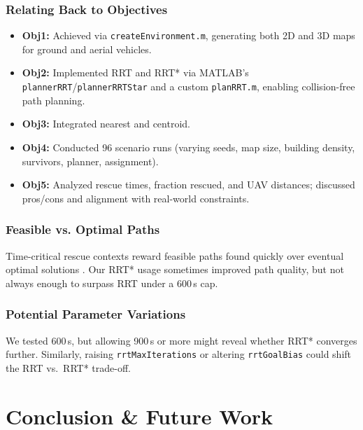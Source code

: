 \documentclass[12pt,a4paper]{report}
\begin{document}
\subsection{Relating Back to Objectives}
\begin{itemize}
    \item \textbf{Obj1:} Achieved via \texttt{createEnvironment.m}, generating both 2D 
    and 3D maps for ground and aerial vehicles.
    \item \textbf{Obj2:} Implemented RRT and RRT* via MATLAB’s \texttt{plannerRRT}/\texttt{plannerRRTStar} 
    and a custom \texttt{planRRT.m}, enabling collision-free path planning.
    \item \textbf{Obj3:} Integrated nearest and centroid. 
    \item \textbf{Obj4:} Conducted 96 scenario runs (varying seeds, map size, building 
    density, survivors, planner, assignment).
    \item \textbf{Obj5:} Analyzed rescue times, fraction rescued, and UAV distances; 
    discussed pros/cons and alignment with real-world constraints.
\end{itemize}

\subsection{Feasible vs. Optimal Paths}
Time-critical rescue contexts reward feasible paths found quickly over eventual optimal 
solutions \cite{Zhang2024ShrinkingPOMCP}. Our RRT* usage sometimes improved path quality, but not always 
enough to surpass RRT under a 600\,s cap.

\subsection{Potential Parameter Variations}
We tested 600\,s, but allowing 900\,s or more might reveal whether RRT* converges further. 
Similarly, raising \texttt{rrtMaxIterations} or altering \texttt{rrtGoalBias} could shift 
the RRT vs.\ RRT* trade-off.

\chapter{Conclusion \& Future Work}
\label{ch:conclusion}
\end{document}

